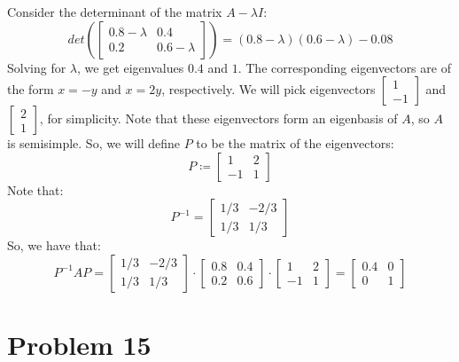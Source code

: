 \documentclass{article}
\begin{document}
Consider the determinant of the matrix $A - \lambda I$:
$$det\left(\begin{bmatrix} 0.8 - \lambda & 0.4 \\ 0.2 & 0.6 - \lambda \end{bmatrix}\right) = (0.8 - \lambda)(0.6 - \lambda) - 0.08$$
Solving for $\lambda$, we get eigenvalues $0.4$ and $1$. The corresponding eigenvectors are of the form $x = -y$ and $x = 2y$, respectively. We will pick eigenvectors $\begin{bmatrix} 1 \\ -1 \end{bmatrix}$ and $\begin{bmatrix} 2 \\ 1 \end{bmatrix}$, for simplicity. Note that these eigenvectors form an eigenbasis of $A$, so $A$ is semisimple. So, we will define $P$ to be the matrix of the eigenvectors:
$$P \coloneqq \begin{bmatrix} 1 & 2 \\ -1 & 1\end{bmatrix}$$
Note that:
$$P^{-1} = \begin{bmatrix} 1/3 & -2 / 3 \\ 1 / 3 & 1 / 3\end{bmatrix}$$
So, we have that:
$$P^{-1}AP = \begin{bmatrix} 1 / 3 & -2 / 3 \\ 1 / 3 & 1 / 3\end{bmatrix} \cdot \begin{bmatrix} 0.8 & 0.4 \\ 0.2 & 0.6 \end{bmatrix} \cdot \begin{bmatrix} 1 & 2 \\ -1 & 1\end{bmatrix} = \begin{bmatrix} 0.4 & 0 \\ 0 & 1 \end{bmatrix}$$


\section*{Problem 15}
\end{document}

